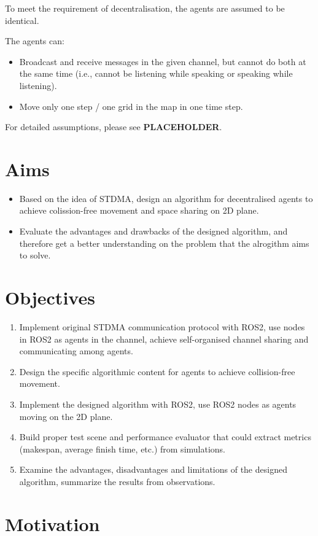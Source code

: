 To meet the requirement of decentralisation, the agents are assumed to be identical.

The agents can:
\begin{itemize}
    \item Broadcast and receive messages in the given channel, but cannot do both at the same time (i.e., cannot be listening while speaking or speaking while listening).
    \item Move only one step / one grid in the map in one time step.
\end{itemize}

For detailed assumptions, please see \textbf{PLACEHOLDER}.


\section{Aims}
\begin{itemize}
    \item Based on the idea of STDMA, design an algorithm for decentralised agents to achieve colission-free movement and space sharing on 2D plane.
    \item Evaluate the advantages and drawbacks of the designed algorithm, and therefore get a better understanding on the problem that the alrogithm aims to solve.
\end{itemize}
\section{Objectives}
\begin{enumerate}
    \item Implement original STDMA communication protocol with ROS2, use nodes in ROS2 as agents in the channel, achieve self-organised channel sharing and communicating among agents.
    \item Design the specific algorithmic content for agents to achieve collision-free movement.
    \item Implement the designed algorithm with ROS2, use ROS2 nodes as agents moving on the 2D plane.
    \item Build proper test scene and performance evaluator that could extract metrics (makespan, average finish time, etc.) from simulations.
    \item Examine the advantages, disadvantages and limitations of the designed algorithm, summarize the results from observations.
\end{enumerate}

\section{Motivation}

